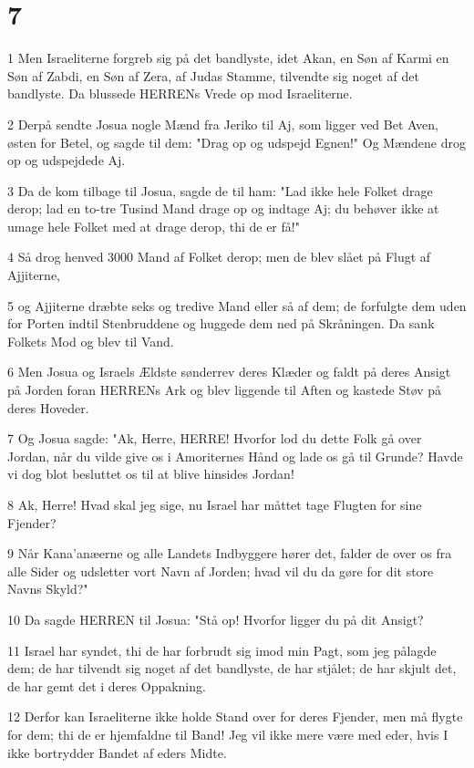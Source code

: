 \chapter{7}

\par 1 Men Israeliterne forgreb sig på det bandlyste, idet Akan, en Søn af Karmi en Søn af Zabdi, en Søn af Zera, af Judas Stamme, tilvendte sig noget af det bandlyste. Da blussede HERRENs Vrede op mod Israeliterne.
\par 2 Derpå sendte Josua nogle Mænd fra Jeriko til Aj, som ligger ved Bet Aven, østen for Betel, og sagde til dem: "Drag op og udspejd Egnen!" Og Mændene drog op og udspejdede Aj.
\par 3 Da de kom tilbage til Josua, sagde de til ham: "Lad ikke hele Folket drage derop; lad en to-tre Tusind Mand drage op og indtage Aj; du behøver ikke at umage hele Folket med at drage derop, thi de er få!"
\par 4 Så drog henved 3000 Mand af Folket derop; men de blev slået på Flugt af Ajjiterne,
\par 5 og Ajjiterne dræbte seks og tredive Mand eller så af dem; de forfulgte dem uden for Porten indtil Stenbruddene og huggede dem ned på Skråningen. Da sank Folkets Mod og blev til Vand.
\par 6 Men Josua og Israels Ældste sønderrev deres Klæder og faldt på deres Ansigt på Jorden foran HERRENs Ark og blev liggende til Aften og kastede Støv på deres Hoveder.
\par 7 Og Josua sagde: "Ak, Herre, HERRE! Hvorfor lod du dette Folk gå over Jordan, når du vilde give os i Amoriternes Hånd og lade os gå til Grunde? Havde vi dog blot besluttet os til at blive hinsides Jordan!
\par 8 Ak, Herre! Hvad skal jeg sige, nu Israel har måttet tage Flugten for sine Fjender?
\par 9 Når Kana'anæerne og alle Landets Indbyggere hører det, falder de over os fra alle Sider og udsletter vort Navn af Jorden; hvad vil du da gøre for dit store Navns Skyld?"
\par 10 Da sagde HERREN til Josua: "Stå op! Hvorfor ligger du på dit Ansigt?
\par 11 Israel har syndet, thi de har forbrudt sig imod min Pagt, som jeg pålagde dem; de har tilvendt sig noget af det bandlyste, de har stjålet; de har skjult det, de har gemt det i deres Oppakning.
\par 12 Derfor kan Israeliterne ikke holde Stand over for deres Fjender, men må flygte for dem; thi de er hjemfaldne til Band! Jeg vil ikke mere være med eder, hvis I ikke bortrydder Bandet af eders Midte.
